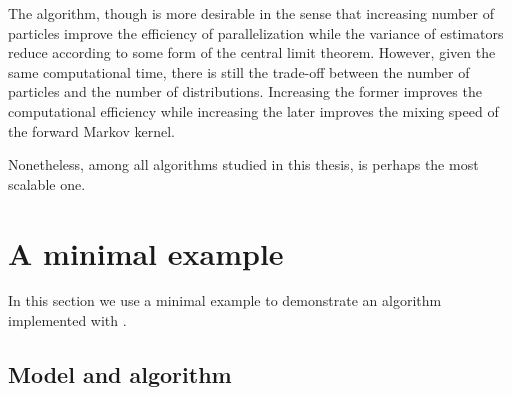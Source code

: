 The \smc algorithm, though is more desirable in the sense that increasing
number of particles improve the efficiency of parallelization while the
variance of estimators reduce according to some form of the central limit
theorem. However, given the same computational time, there is still the
trade-off between the number of particles and the number of distributions.
Increasing the former improves the computational efficiency while increasing
the later improves the mixing speed of the forward Markov kernel.

Nonetheless, among all algorithms studied in this thesis, \smc is perhaps the
most scalable one.

\section{A minimal example}
\label{sec:A minimal example}

In this section we use a minimal example to demonstrate an \smc algorithm
implemented with \vsmc.

\subsection{Model and algorithm}
\label{sub:Model and algorithm}

